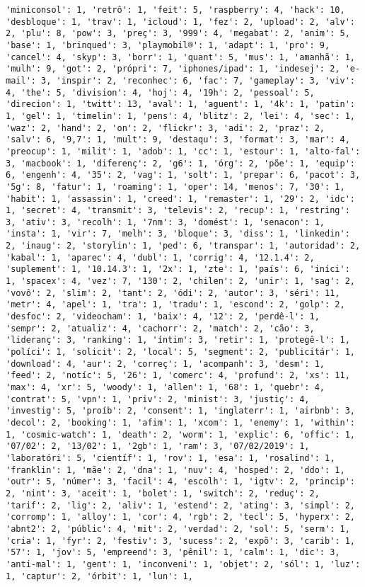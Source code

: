 \documentclass[11pt]{article}
\begin{document}
\begin{Verbatim}[commandchars=\\\{\}]
'miniconsol': 1, 'retrô': 1, 'feit': 5, 'raspberry': 4, 'hack': 10, 'desbloque': 1, 'trav': 1, 'icloud': 1, 'fez': 2, 'upload': 2, 'alv': 2, 'plu': 8, 'pow': 3, 'preç': 3, '999': 4, 'megabat': 2, 'anim': 5, 'base': 1, 'brinqued': 3, 'playmobil®': 1, 'adapt': 1, 'pro': 9, 'cancel': 4, 'skyp': 3, 'borr': 1, 'quant': 5, 'mus': 1, 'amanhã': 1, 'mulh': 9, 'got': 2, 'própri': 7, 'iphones/ipad': 1, 'indesej': 2, 'e-mail': 3, 'inspir': 2, 'reconhec': 6, 'fac': 7, 'gameplay': 3, 'viv': 4, 'the': 5, 'division': 4, 'hoj': 4, '19h': 2, 'pessoal': 5, 'direcion': 1, 'twitt': 13, 'aval': 1, 'aguent': 1, '4k': 1, 'patin': 1, 'gel': 1, 'timelin': 1, 'pens': 4, 'blitz': 2, 'lei': 4, 'sec': 1, 'waz': 2, 'hand': 2, 'on': 2, 'flickr': 3, 'adi': 2, 'praz': 2, 'salv': 6, '9,7': 1, 'mult': 9, 'destaqu': 3, 'format': 3, 'mar': 4, 'preocup': 1, 'milit': 1, 'adob': 1, 'cc': 1, 'estour': 1, 'alto-fal': 3, 'macbook': 1, 'diferenç': 2, 'g6': 1, 'órg': 2, 'põe': 1, 'equip': 6, 'engenh': 4, '35': 2, 'vag': 1, 'solt': 1, 'prepar': 6, 'pacot': 3, '5g': 8, 'fatur': 1, 'roaming': 1, 'oper': 14, 'menos': 7, '30': 1, 'habit': 1, 'assassin': 1, 'creed': 1, 'remaster': 1, '29': 2, 'idc': 1, 'secret': 4, 'transmit': 3, 'televis': 2, 'recup': 1, 'restring': 3, 'ativ': 3, 'recolh': 1, '7nm': 3, 'domést': 1, 'senacon': 1, 'insta': 1, 'vir': 7, 'melh': 3, 'bloque': 3, 'diss': 1, 'linkedin': 2, 'inaug': 2, 'storylin': 1, 'ped': 6, 'transpar': 1, 'autoridad': 2, 'kabal': 1, 'aparec': 4, 'dubl': 1, 'corrig': 4, '12.1.4': 2, 'suplement': 1, '10.14.3': 1, '2x': 1, 'zte': 1, 'país': 6, 'iníci': 1, 'spacex': 4, 'vez': 7, '130': 2, 'chilen': 2, 'unir': 1, 'sag': 2, 'vovô': 2, 'slim': 2, 'tant': 2, 'ódi': 2, 'autor': 3, 'séri': 11, 'metr': 4, 'apel': 1, 'tra': 1, 'tradu': 1, 'escond': 2, 'golp': 2, 'desfoc': 2, 'videocham': 1, 'baix': 4, '12': 2, 'perdê-l': 1, 'sempr': 2, 'atualiz': 4, 'cachorr': 2, 'match': 2, 'cão': 3, 'lideranç': 3, 'ranking': 1, 'íntim': 3, 'retir': 1, 'protegê-l': 1, 'políci': 1, 'solicit': 2, 'local': 5, 'segment': 2, 'publicitár': 1, 'download': 4, 'aur': 2, 'correç': 1, 'acompanh': 3, 'desm': 1, 'feed': 2, 'notíc': 5, '26': 1, 'comerc': 4, 'profund': 2, 'xs': 11, 'max': 4, 'xr': 5, 'woody': 1, 'allen': 1, '68': 1, 'quebr': 4, 'contrat': 5, 'vpn': 1, 'priv': 2, 'minist': 3, 'justiç': 4, 'investig': 5, 'proíb': 2, 'consent': 1, 'inglaterr': 1, 'airbnb': 3, 'decol': 2, 'booking': 1, 'afim': 1, 'xcom': 1, 'enemy': 1, 'within': 1, 'cosmic-watch': 1, 'death': 2, 'worm': 1, 'explic': 6, 'offic': 1, '07/02': 2, '13/02': 1, '2gb': 1, 'ram': 3, '07/02/2019': 1, 'laboratóri': 5, 'científ': 1, 'rov': 1, 'esa': 1, 'rosalind': 1, 'franklin': 1, 'mãe': 2, 'dna': 1, 'nuv': 4, 'hosped': 2, 'ddo': 1, 'outr': 5, 'númer': 3, 'facil': 4, 'escolh': 1, 'igtv': 2, 'princip': 2, 'nint': 3, 'aceit': 1, 'bolet': 1, 'switch': 2, 'reduç': 2, 'tarif': 2, 'lig': 2, 'aliv': 1, 'estend': 2, 'ating': 3, 'simpl': 2, 'corromp': 1, 'alloy': 1, 'cor': 4, 'rgb': 2, 'tecl': 5, 'hyperx': 2, 'abnt2': 2, 'públic': 4, 'mit': 2, 'verdad': 2, 'sol': 5, 'serm': 1, 'cria': 1, 'fyr': 2, 'festiv': 3, 'sucess': 2, 'expõ': 3, 'carib': 1, '57': 1, 'jov': 5, 'empreend': 3, 'pênil': 1, 'calm': 1, 'dic': 3, 'anti-mal': 1, 'gent': 1, 'inconveni': 1, 'objet': 2, 'sól': 1, 'luz': 1, 'captur': 2, 'órbit': 1, 'lun': 1, 
\end{Verbatim}
\end{document}
